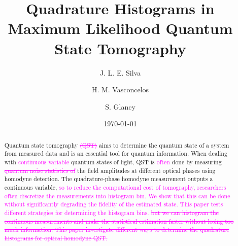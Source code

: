 \documentclass[
reprint,
superscriptaddress,
showpacs,
amsmath,
amssymb,
aps,
pra,
longbibliography
]{revtex4-1}
\providecommand{\aucmnt}[1]{#1}
\providecommand{\editcolor}[2]{\textcolor{#1}{#2}}
\providecommand{\aucmnt}[1]{}
\providecommand{\editcolor}[2]{#2}
\newcommand{\SG}[1]{\editcolor{magenta}{#1}}
\newcommand{\SGs}[1]{\aucmnt{\editcolor{magenta}{\sout{#1}}}}
\begin{document}

\title{Quadrature Histograms in Maximum Likelihood Quantum State Tomography}%
\author{J. L. E. Silva}
\author{H. M. Vasconcelos}
\author{S. Glancy}


\date{\today}%

\begin{abstract}
  Quantum state tomography \SGs{(QST)} aims to determine the quantum
  state of a system from measured data and is an essential tool for
  quantum information. When dealing with \SG{continuous variable}
  quantum states of light, QST is \SG{often} done by measuring
  \SGs{quantum noise statistics of} the field amplitudes at different
  optical phases using homodyne detection. The quadrature-phase
  homodyne measurement outputs a continuous variable, \SG{so to reduce
    the computational cost of tomography, researchers often discretize
    the measurements into histogram bin.  We show that this can be
    done without significantly degrading the fidelity of the estimated
    state.  This paper tests different strategies for determining the
    histogram bins.} \SGs{but we can histogram the continuous
    measurements and make the statistical estimation faster without
    losing too much information. This paper investigate different ways
    to determine the quadrature histograms for optical homodyne QST.}
\end{abstract}

\maketitle
\end{document}
